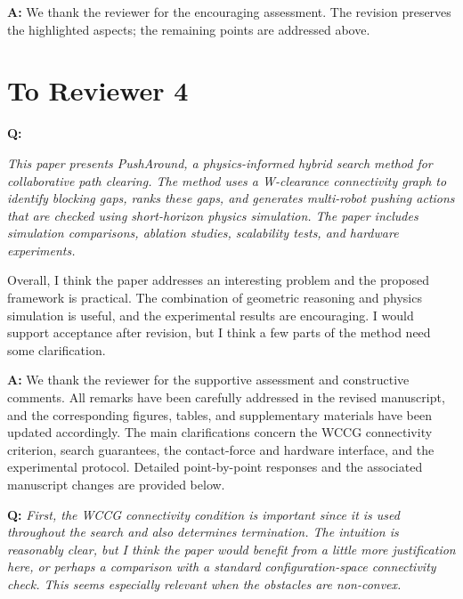 \documentclass[11pt]{article}
\begin{document}
\noindent \textbf{A:}
We thank the reviewer for the encouraging assessment. The revision preserves the highlighted aspects; the remaining points are addressed above.

\newpage
\section*{To Reviewer 4}

\begin{shaded*}
\noindent \textbf{Q:}
{\itshape
This paper presents PushAround, a physics-informed hybrid search method
for collaborative path clearing. The method uses a W-clearance
connectivity graph to identify blocking gaps, ranks these gaps, and
generates multi-robot pushing actions that are checked using
short-horizon physics simulation. The paper includes simulation
comparisons, ablation studies, scalability tests, and hardware
experiments.

Overall, I think the paper addresses an interesting problem and the
proposed framework is practical. The combination of geometric reasoning
and physics simulation is useful, and the experimental results are
encouraging. I would support acceptance after revision, but I think a
few parts of the method need some clarification.
}
\end{shaded*}

\noindent \textbf{A:}
We thank the reviewer for the supportive assessment and constructive comments. 
All remarks have been carefully addressed in the revised manuscript, 
and the corresponding figures, tables, 
and supplementary materials have been updated accordingly. 
The main clarifications concern the WCCG connectivity criterion, search guarantees, 
the contact-force and hardware interface, and the experimental protocol. 
Detailed point-by-point responses and the associated manuscript changes 
are provided below.

\begin{shaded*}
\noindent \textbf{Q:}
{\itshape
First, the WCCG connectivity condition is important since it is used
throughout the search and also determines termination. The intuition is
reasonably clear, but I think the paper would benefit from a little
more justification here, or perhaps a comparison with a standard
configuration-space connectivity check. This seems especially relevant
when the obstacles are non-convex.
}
\end{shaded*}
\end{document}
